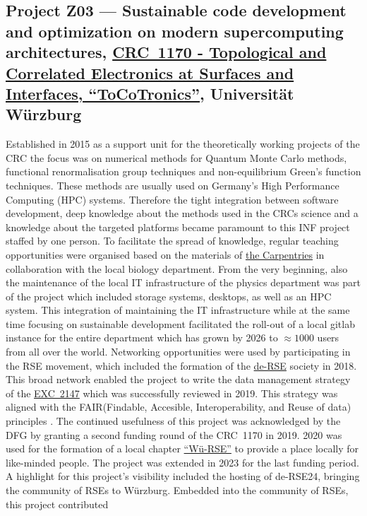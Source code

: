 \documentclass{eceasst}
\begin{document}
\subsection{Project Z03 --- Sustainable code development and optimization on modern supercomputing architectures, \href{https://gepris.dfg.de/gepris/projekt/258499086?language=en}{CRC~1170 - Topological and Correlated Electronics at Surfaces and Interfaces, ``ToCoTronics''}, Universität Würzburg}
Established in 2015 as a support unit for the theoretically working projects of the CRC the focus was on numerical methods for Quantum Monte Carlo methods, functional renormalisation group techniques and non-equilibrium Green's function techniques. These methods are usually used on
Germany's High Performance Computing (HPC) systems. Therefore the tight integration between software development, deep knowledge about the methods used in the CRCs science and a knowledge about the targeted platforms became paramount to this INF project staffed by one person.
To facilitate the spread of knowledge, regular teaching opportunities were organised based on the materials of \href{https://carpentries.org/}{the Carpentries} in collaboration with the local biology department.
From the very beginning, also the maintenance of the local IT infrastructure of the physics department was part of the project which included
storage systems, desktops, as well as an HPC system.
This integration of maintaining the IT infrastructure while at the same time focusing on sustainable development
facilitated the roll-out of a local gitlab instance for the entire department which has grown by 2026 to $\approx 1000$ users from all
over the world. Networking opportunities were used by participating in the RSE movement, which included the formation of the \href{https://de-rse.org/de/index.html}{de-RSE} society in 2018.
This broad network enabled the project to write the data management strategy of the \href{https://www.ctdqmat.de/}{EXC~2147} which was successfully reviewed in 2019. This  strategy was aligned with the FAIR(Findable, Accesible, Interoperability, and Reuse of data) principles \cite{WilkinsonDumontier2016}.
The continued usefulness of this project was acknowledged by the DFG by granting a second funding round of the CRC~1170 in 2019.
2020 was used for the formation of a local chapter \href{https://de-rse.org/chapter/wue/}{``Wü-RSE''} to provide a place
locally for like-minded people. The project was extended in 2023 for the last funding period. A highlight for this project's visibility included the hosting of de-RSE24, bringing the community of RSEs to Würzburg. Embedded into the community of RSEs, this project contributed
\end{document}
